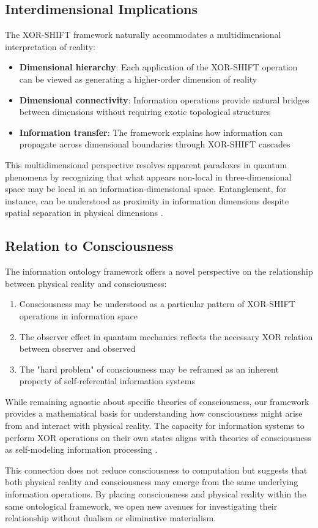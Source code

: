 \subsection{Interdimensional Implications}

The XOR-SHIFT framework naturally accommodates a multidimensional interpretation of reality:

\begin{itemize}
    \item \textbf{Dimensional hierarchy}: Each application of the XOR-SHIFT operation can be viewed as generating a higher-order dimension of reality
    \item \textbf{Dimensional connectivity}: Information operations provide natural bridges between dimensions without requiring exotic topological structures
    \item \textbf{Information transfer}: The framework explains how information can propagate across dimensional boundaries through XOR-SHIFT cascades
\end{itemize}

This multidimensional perspective resolves apparent paradoxes in quantum phenomena by recognizing that what appears non-local in three-dimensional space may be local in an information-dimensional space. Entanglement, for instance, can be understood as proximity in information dimensions despite spatial separation in physical dimensions \cite{Frauchiger2018quantum}.

\subsection{Relation to Consciousness}

The information ontology framework offers a novel perspective on the relationship between physical reality and consciousness:

\begin{enumerate}
    \item Consciousness may be understood as a particular pattern of XOR-SHIFT operations in information space
    \item The observer effect in quantum mechanics reflects the necessary XOR relation between observer and observed
    \item The "hard problem" of consciousness may be reframed as an inherent property of self-referential information systems
\end{enumerate}

While remaining agnostic about specific theories of consciousness, our framework provides a mathematical basis for understanding how consciousness might arise from and interact with physical reality. The capacity for information systems to perform XOR operations on their own states aligns with theories of consciousness as self-modeling information processing \cite{Hoffman2015}.

This connection does not reduce consciousness to computation but suggests that both physical reality and consciousness may emerge from the same underlying information operations. By placing consciousness and physical reality within the same ontological framework, we open new avenues for investigating their relationship without dualism or eliminative materialism.
